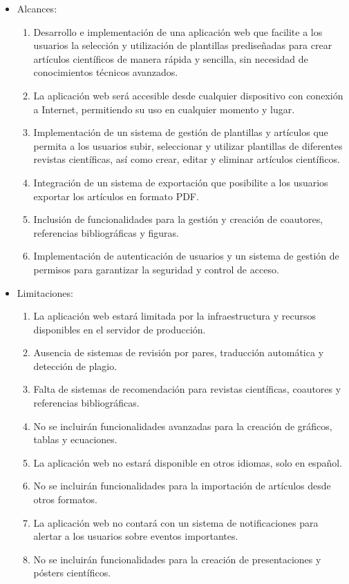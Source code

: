 \begin{itemize}
    \item Alcances:
    \begin{enumerate}
    \item Desarrollo e implementación de una aplicación web que facilite a los usuarios la selección y utilización de plantillas prediseñadas para crear artículos científicos de manera rápida y sencilla, sin necesidad de conocimientos técnicos avanzados.
    \item La aplicación web será accesible desde cualquier dispositivo con conexión a Internet, permitiendo su uso en cualquier momento y lugar.
    \item Implementación de un sistema de gestión de plantillas y artículos que permita a los usuarios subir, seleccionar y utilizar plantillas de diferentes revistas científicas, así como crear, editar y eliminar artículos científicos.
    \item Integración de un sistema de exportación que posibilite a los usuarios exportar los artículos en formato PDF.
    \item Inclusión de funcionalidades para la gestión y creación de coautores, referencias bibliográficas y figuras.
    \item Implementación de autenticación de usuarios y un sistema de gestión de permisos para garantizar la seguridad y control de acceso.
    \end{enumerate}
    \item Limitaciones:
    \begin{enumerate}
    \item La aplicación web estará limitada por la infraestructura y recursos disponibles en el servidor de producción.
    \item Ausencia de sistemas de revisión por pares, traducción automática y detección de plagio.
    \item Falta de sistemas de recomendación para revistas científicas, coautores y referencias bibliográficas.
    \item No se incluirán funcionalidades avanzadas para la creación de gráficos, tablas y ecuaciones.
    \item La aplicación web no estará disponible en otros idiomas, solo en español.
    \item No se incluirán funcionalidades para la importación de artículos desde otros formatos.
    \item La aplicación web no contará con un sistema de notificaciones para alertar a los usuarios sobre eventos importantes.
    \item No se incluirán funcionalidades para la creación de presentaciones y pósters científicos.
    \end{enumerate}
    \end{itemize}

